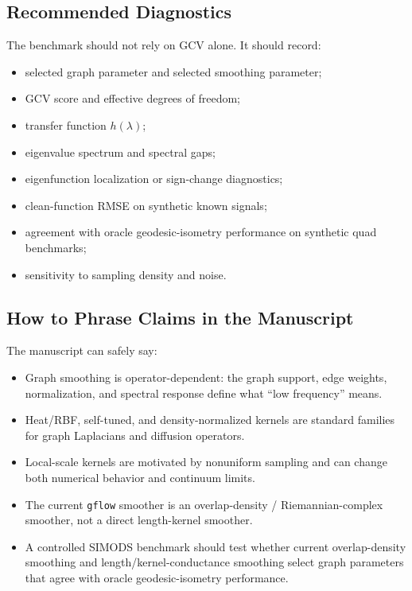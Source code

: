 \documentclass[11pt]{article}
\newcommand{\code}[1]{\texttt{#1}}
\begin{document}
\subsection{Recommended Diagnostics}

The benchmark should not rely on GCV alone.  It should record:
\begin{itemize}
  \item selected graph parameter and selected smoothing parameter;
  \item GCV score and effective degrees of freedom;
  \item transfer function \(h(\lambda)\);
  \item eigenvalue spectrum and spectral gaps;
  \item eigenfunction localization or sign-change diagnostics;
  \item clean-function RMSE on synthetic known signals;
  \item agreement with oracle geodesic-isometry performance on synthetic quad
    benchmarks;
  \item sensitivity to sampling density and noise.
\end{itemize}

\subsection{How to Phrase Claims in the Manuscript}

The manuscript can safely say:

\begin{itemize}
  \item Graph smoothing is operator-dependent: the graph support, edge weights,
    normalization, and spectral response define what ``low frequency'' means.
  \item Heat/RBF, self-tuned, and density-normalized kernels are standard
    families for graph Laplacians and diffusion operators.
  \item Local-scale kernels are motivated by nonuniform sampling and can change
    both numerical behavior and continuum limits.
  \item The current \code{gflow} smoother is an overlap-density /
    Riemannian-complex smoother, not a direct length-kernel smoother.
  \item A controlled SIMODS benchmark should test whether current
    overlap-density smoothing and length/kernel-conductance smoothing select
    graph parameters that agree with oracle geodesic-isometry performance.
\end{itemize}
\end{document}
